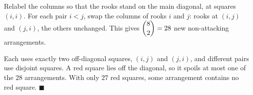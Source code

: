 Relabel the columns so that the rooks stand on the main diagonal, at squares $(i,i)$. For each pair $i<j$, swap the columns of rooks $i$ and $j$: rooks at $(i,j)$ and $(j,i)$, the others unchanged. This gives $\dbinom82=28$ new non-attacking arrangements.

Each uses exactly two off-diagonal squares, $(i,j)$ and $(j,i)$, and different pairs use disjoint squares. A red square lies off the diagonal, so it spoils at most one of the $28$ arrangements. With only $27$ red squares, some arrangement contains no red square. $\blacksquare$
